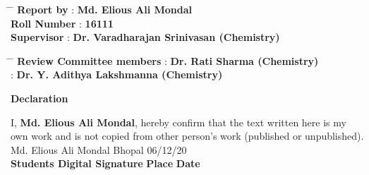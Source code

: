 \documentclass[12pt]{article}
\begin{document}
\begin{titlepage}
\begin{tabbing} %
\hspace{8cm} \= \hspace{4cm} \= \kill 
{\bf Report by} \> : \textbf{Md. Elious Ali Mondal}\\ 
{\bf Roll Number } \> : \textbf{16111} \\ 
{\bf Supervisor} \> : \textbf{Dr. Varadharajan Srinivasan (Chemistry)} \\
\end{tabbing}
\vspace{2mm}
\begin{tabbing}
\hspace{8cm} \= \hspace{4cm} \= \kill
{\bf Review Committee members} \> : \textbf{Dr. Rati Sharma (Chemistry)}\\
{} \> : \textbf{Dr. Y. Adithya Lakshmanna (Chemistry)}
\end{tabbing}
\vspace{20mm}
\begin{center}
\large\textbf{Declaration}\\
\end{center}
\begin{large}
I, \textbf{Md. Elious Ali Mondal}, hereby confirm that the text written here is my own
work and is not copied from other person’s work (published or unpublished).\\

\vspace{10mm}
Md. Elious Ali Mondal \hspace{3.85cm} Bhopal \hspace{2.5cm} 06/12/20 \\  \textbf{Students Digital Signature} \hspace{3cm} \textbf{Place} \hspace{3cm} \textbf{Date}
\end{large}

\end{titlepage}


\tableofcontents
\thispagestyle{empty}
\clearpage
\setcounter{page}{1}
\end{document}
